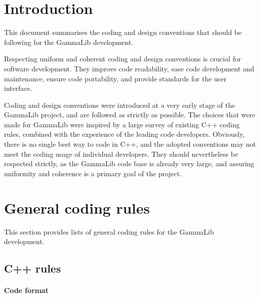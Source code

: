 \documentclass{article}[12pt,a4]
\begin{document}
\frontpage


\section{Introduction}

This document summarises the coding and design conventions that should be following for
the GammaLib development.

Respecting uniform and coherent coding and design conventions is crucial for software
development.
They improve code readability, ease code development and maintenance, ensure code
portability, and provide standards for the user interface.

Coding and design conventions were introduced at a very early stage of the GammaLib project, and
are followed as strictly as possible.
The choices that were made for GammaLib were inspired by a large survey of existing C++ coding
rules, combined with the experience of the leading code developers.
Obviously, there is no single best way to code in C++, and the adopted conventions may not
meet the coding usage of individual developers.
They should nevertheless be respected strictly, as the GammaLib code base is already very large,
and assuring uniformity and coherence is a primary goal of the project.


\section{General coding rules}

This section provides lists of general coding rules for the GammaLib development.

\subsection{C++ rules}

\paragraph{Code format}
\end{document}
